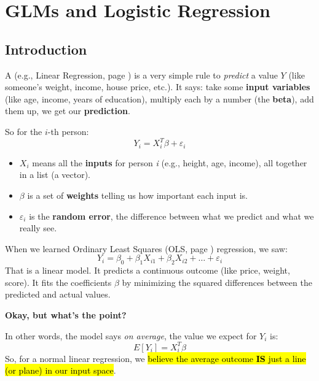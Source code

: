 \section{GLMs and Logistic Regression}

\subsection{Introduction}

A  (e.g., Linear Regression, page \pageref{subsection: Simple Linear Regression}) is a very simple rule to \emph{predict} a value $Y$ (like someone's weight, income, house price, etc.). It says: take some \textbf{input variables} (like age, income, years of education), multiply each by a number (the \textbf{beta}), add them up, we get our \textbf{prediction}.

\highspace
So for the $i$-th person:
\begin{equation*}
    Y_i = X_i^T \beta + \varepsilon_i
\end{equation*}
\begin{itemize}
    \item $X_i$ means all the \textbf{inputs} for person \emph{i} (e.g., height, age, income), all together in a list (a vector).
    \item $\beta$ is a set of \textbf{weights} telling us how important each input is.
    \item $\varepsilon_i$ is the \textbf{random error}, the difference between what we predict and what we really see.
\end{itemize}

\highspace
When we learned Ordinary Least Squares (OLS, page \pageref{def: Ordinary Least Squares Estimation}) regression, we saw:
\begin{equation*}
    Y_i = \beta_0 + \beta_1 X_{i1} + \beta_2 X_{i2} + \dots + \varepsilon_i
\end{equation*}
That is a linear model. It predicts a continuous outcome (like price, weight, score). It fits the coefficients $\beta$ by minimizing the squared differences between the predicted and actual values.

\highspace
\begin{flushleft}
    \textcolor{Green3}{ \textbf{Okay, but what's the point?}}
\end{flushleft}
In other words, the model says \emph{on average}, the value we expect for $Y_i$ is:
\begin{equation*}
    E[Y_i] = X_i^T \beta
\end{equation*}
So, for a normal linear regression, we \hl{believe the average outcome \textbf{IS} just a line (or plane) in our input space}.

